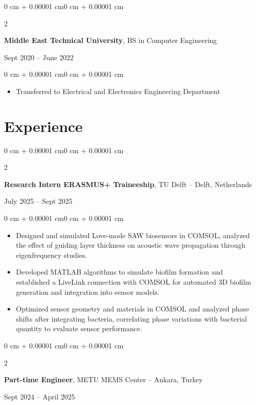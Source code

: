 \documentclass[10pt, letterpaper]{article}
\newenvironment{highlights}{
    \begin{itemize}[
        topsep=0.10 cm,
        parsep=0.10 cm,
        partopsep=0pt,
        itemsep=0pt,
        leftmargin=0 cm + 10pt
    ]
}{
    \end{itemize}
} %
\newenvironment{onecolentry}{
    \begin{adjustwidth}{0 cm + 0.00001 cm}{0 cm + 0.00001 cm}
}{
    \end{adjustwidth}
} %
\newenvironment{twocolentry}[2][]{
    \onecolentry
    \def\secondColumn{#2}
    \setcolumnwidth{\fill, 4.5 cm}
    \begin{paracol}{2}
}{
    \switchcolumn \raggedleft \secondColumn
    \end{paracol}
    \endonecolentry
} %
\begin{document}
\begin{twocolentry}{Sept 2020 – June 2022}
    \textbf{Middle East Technical University}, BS in Computer Engineering
\end{twocolentry}

\vspace{0.10 cm}
\begin{onecolentry}
    \begin{highlights}
        \item Transferred to Electrical and Electronics Engineering Department
    \end{highlights}
\end{onecolentry}

\section{Experience}

\begin{twocolentry}{July 2025 – Sept 2025}
    \textbf{Research Intern ERASMUS+ Traineeship}, TU Delft -- Delft, Netherlands
\end{twocolentry}

\vspace{0.10 cm}
\begin{onecolentry}
    \begin{highlights}
        \item Designed and simulated Love-mode SAW biosensors in COMSOL, analyzed the effect of guiding layer thickness on acoustic wave propagation through eigenfrequency studies.
        \item Developed MATLAB algorithms to simulate biofilm formation and established a LiveLink connection with COMSOL for automated 3D biofilm generation and integration into sensor models.
        \item Optimized sensor geometry and materials in COMSOL and analyzed phase shifts after integrating bacteria, correlating phase variations with bacterial quantity to evaluate sensor performance.
    \end{highlights}
\end{onecolentry}

\vspace{0.2 cm}
\begin{twocolentry}{Sept 2024 – April 2025}
    \textbf{Part-time Engineer}, METU MEMS Center -- Ankara, Turkey
\end{twocolentry}
\end{document}
